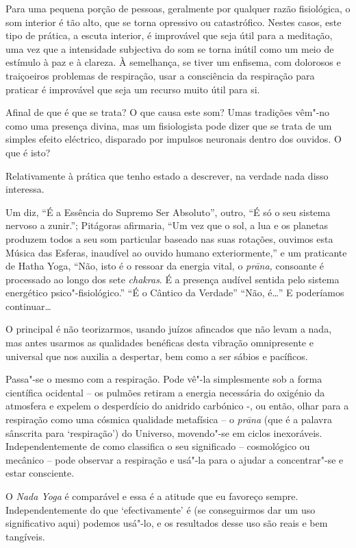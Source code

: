 Para uma pequena porção de pessoas, geralmente por qualquer razão
fisiológica, o som interior é tão alto, que se torna opressivo ou
catastrófico. Nestes casos, este tipo de prática, a escuta interior, é
improvável que seja útil para a meditação, uma vez que a intensidade
subjectiva do som se torna inútil como um meio de estímulo à paz e à
clareza. À semelhança, se tiver um enfisema, com dolorosos e traiçoeiros
problemas de respiração, usar a consciência da respiração para praticar
é improvável que seja um recurso muito útil para si.

\smallskip

 Afinal de que é que se trata? O que causa este som? Umas tradições
vêm"-no como uma presença divina, mas um fisiologista pode dizer que se
trata de um simples efeito eléctrico, disparado por impulsos neuronais
dentro dos ouvidos. O que é isto?

 Relativamente à prática que tenho estado a descrever, na verdade nada
disso interessa.

Um diz, ``É a Essência do Supremo Ser Absoluto'', outro, ``É só o seu
sistema nervoso a zunir.''; Pitágoras afirmaria, ``Um vez que o sol, a
lua e os planetas produzem todos a seu som particular baseado nas suas
rotações, ouvimos esta Música das Esferas, inaudível ao ouvido humano
exteriormente,'' e um praticante de Hatha Yoga, ``Não, isto é o ressoar
da energia vital, o \emph{prāna,} consoante é processado ao longo dos
sete \emph{chakras}. É a presença audível sentida pelo sistema
energético psico"-fisiológico.'' ``É o Cântico da Verdade'' ``Não,
é\ldots{}'' E poderíamos continuar\ldots{}

O principal é não teorizarmos, usando juízos afincados que não levam a
nada, mas antes usarmos as qualidades benéficas desta vibração
omnipresente e universal que nos auxilia a despertar, bem como a ser
sábios e pacíficos.

Passa"-se o mesmo com a respiração. Pode vê"-la simplesmente sob a forma
científica ocidental -- os pulmões retiram a energia necessária do
oxigénio da atmosfera e expelem o desperdício do anidrido carbónico -,
ou então, olhar para a respiração como uma cósmica qualidade metafísica
-- o \emph{prāna} (que é a palavra sânscrita para `respiração') do
Universo, movendo"-se em ciclos inexoráveis. Independentemente de como
classifica o seu significado -- cosmológico ou mecânico -- pode observar
a respiração e usá"-la para o ajudar a concentrar"-se e estar consciente.

O \emph{Nada Yoga} é comparável e essa é a atitude que eu favoreço
sempre. Independentemente do que `efectivamente' é (se conseguirmos dar
um uso significativo aqui) podemos usá"-lo, e os resultados desse uso são
reais e bem tangíveis.

